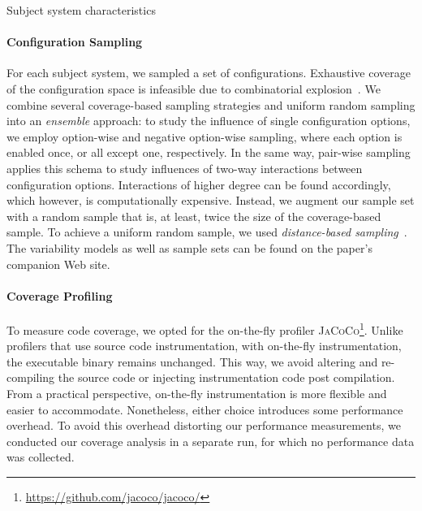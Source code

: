 \begin{table}[ht!]
		\centering
		\caption{Subject system characteristics}
		
		\label{tab:subject_systems}
	\end{table}

\paragraph*{Configuration Sampling}\label{sec:sampling}
For each subject system, we sampled a set of configurations. Exhaustive coverage of the configuration space is infeasible due to combinatorial explosion~\cite{henardCombining2015}. We combine several coverage-based sampling strategies and uniform random sampling into an \emph{ensemble} approach: to study the influence of single configuration options, we employ option-wise and negative option-wise sampling, where each option is enabled once, or all except one, respectively. In the same way, pair-wise sampling applies this schema to study influences of two-way interactions between configuration options. Interactions of higher degree can be found accordingly, which however, is computationally expensive. Instead, we augment our sample set with a random sample that is, at least, twice the size of the coverage-based sample. To achieve a uniform random sample, we used \emph{distance-based sampling}~\cite{kaltenecker_distance-based_2019}. The variability models as well as sample sets can be found on the paper's companion Web site.
	
\paragraph*{Coverage Profiling}\label{sec:profiling}
	To measure code coverage, we opted for the on-the-fly profiler \textsc{JaCoCo}\footnote{\url{https://github.com/jacoco/jacoco/}}. Unlike profilers that use source code instrumentation, with on-the-fly instrumentation, the executable binary remains unchanged. This way, we avoid altering and re-compiling the source code or injecting instrumentation code post compilation. From a practical perspective, on-the-fly instrumentation is more flexible and easier to accommodate. Nonetheless, either choice introduces some performance overhead. To avoid this overhead distorting our performance measurements, we conducted our coverage analysis in a separate run, for which no performance data was collected. 	
	
